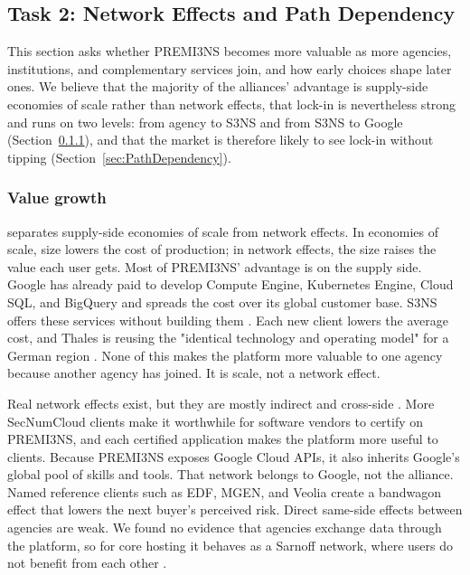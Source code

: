\subsection{Task 2: Network Effects and Path Dependency}
\label{sec:task2}


This section asks whether PREMI3NS becomes more valuable as more agencies, institutions, and complementary services join, and how early choices shape later ones. We believe that the majority of the alliances' advantage is supply-side economies of scale rather than network effects, that lock-in is nevertheless strong and runs on two levels: from agency to S3NS and from S3NS to Google (Section~\ref{sec:ValueGrowth}), and that the market is therefore likely to see lock-in without tipping (Section~\ref{sec:PathDependency}).  

\subsubsection{Value growth}
\label{sec:ValueGrowth}

\textcite[p.~124]{overby2021} separates supply-side economies of scale from network effects. In economies of scale, size lowers the cost of production; in network effects, the size raises the value each user gets. Most of PREMI3NS' advantage is on the supply side. Google has already paid to develop Compute Engine, Kubernetes Engine, Cloud SQL, and BigQuery and spreads the cost over its global customer base. S3NS offers these services without building them \parencite{s3ns2025premi3ns}. Each new client lowers the average cost, and Thales is reusing the "identical technology and operating model" for a German region \parencite{thalesgoogle2026}. None of this makes the platform more valuable to one agency because another agency has joined. It is scale, not a network effect. 

Real network effects exist, but they are mostly indirect and cross-side \parencite[pp.~135--136]{overby2021}. More SecNumCloud clients make it worthwhile for software vendors to certify on PREMI3NS, and each certified application makes the platform more useful to clients. Because PREMI3NS exposes Google Cloud APIs, it also inherits Google's global pool of skills and tools. That network belongs to Google, not the alliance. Named reference clients such as EDF, MGEN, and Veolia \parencite{s3ns2025premi3ns} create a bandwagon effect \parencite[p.~135]{overby2021} that lowers the next buyer's perceived risk. Direct same-side effects between agencies are weak. We found no evidence that agencies exchange data through the platform, so for core hosting it behaves as a Sarnoff network, where users do not benefit from each other \parencite[pp.~137--138]{overby2021}.

